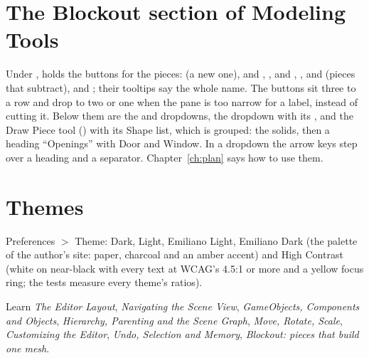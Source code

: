 \section{The Blockout section of Modeling Tools}
Under ,  holds the buttons for the pieces:  (a new one),
 and , ,  and , ,  and  (pieces that
subtract),  and ; their tooltips say the whole name. The buttons sit three to a row and drop to two
or one when the pane is too narrow for a label, instead of cutting it. Below them are the  and  dropdowns, the  dropdown with its , and the Draw Piece tool () with its Shape
list, which is grouped: the solids, then a heading ``Openings'' with Door and Window. In a dropdown the arrow keys step over
a heading and a separator. Chapter~\ref{ch:plan} says how to use them.

\section{Themes}
Preferences $>$ Theme: Dark, Light, Emiliano Light, Emiliano Dark (the palette of the author's site: paper, charcoal
and an amber accent) and High Contrast (white on near-black with every text at WCAG's 4.5:1 or more
\cite{W3C2018Web} and a yellow focus ring; the tests measure every theme's ratios).

\begin{fromnote}{Learn}
\emph{The Editor Layout}, \emph{Navigating the Scene View}, \emph{GameObjects, Components and Objects},
\emph{Hierarchy, Parenting and the Scene Graph}, \emph{Move, Rotate, Scale}, \emph{Customizing the Editor},
\emph{Undo, Selection and Memory}, \emph{Blockout: pieces that build one mesh}.
\end{fromnote}
